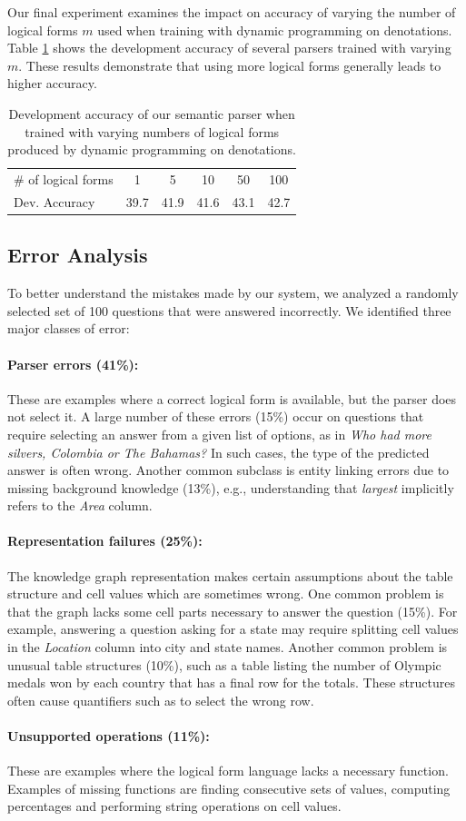Our final experiment examines the impact on accuracy of varying the number of logical forms $m$ used when training with dynamic programming on denotations. Table \ref{tab:dpd_results} shows the development accuracy of several parsers trained with varying $m$. These results demonstrate that using more logical forms generally leads to higher accuracy.

\begin{table}
	\centering
	\begin{tabular}{lccccc} \toprule
	\# of logical forms & 1 & 5 & 10 & 50 & 100 \\
	Dev. Accuracy & 39.7 & 41.9 & 41.6 & 43.1 & 42.7 \\ \bottomrule
	\end{tabular}
	\caption{Development accuracy of our semantic parser when trained with varying numbers of logical forms produced by dynamic programming on denotations.}\label{tab:dpd_results}
\end{table}

\subsection{Error Analysis}

To better understand the mistakes made by our system, we analyzed a randomly selected set of 100 questions that were answered incorrectly. We identified three major classes of error:

\paragraph{Parser errors (41\%):} These are examples where a correct logical form is available, but the parser does not select it. A large number of these errors (15\%) occur on questions that require selecting an answer from a given list of options, as in \textit{Who had more silvers, Colombia or The Bahamas?} In such cases, the type of the predicted answer is often wrong. Another common subclass is entity linking errors due to missing background knowledge (13\%), e.g., understanding that \textit{largest} implicitly refers to the \textit{Area} column.

\paragraph{Representation failures (25\%):} The knowledge graph representation makes certain assumptions about the table structure and cell values which are sometimes wrong. One common problem is that the graph lacks some cell parts necessary to answer the question (15\%). For example, answering a question asking for a state may require splitting cell values in the \textit{Location} column into city and state names. Another common problem is unusual table structures (10\%), such as a table listing the number of Olympic medals won by each country that has a final row for the totals. These structures often cause quantifiers such as  to select the wrong row.

\paragraph{Unsupported operations (11\%):} These are examples where the logical form language lacks a necessary function. Examples of missing functions are finding consecutive sets of values, computing percentages and performing string operations on cell values.

